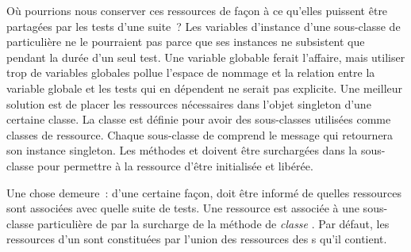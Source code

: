 \documentclass[a4paper,10pt,twoside]{book}
\begin{document}
Où pourrions nous conserver ces ressources de façon à ce qu'elles puissent être partagées par les tests d'une suite~?
Les variables d'instance d'une sous-classe de  particulière ne le pourraient pas parce que ses instances ne subsistent que pendant la durée d'un seul test.
Une variable globable ferait l'affaire, mais utiliser trop de variables globales pollue l'espace de nommage et la relation entre la variable globale et les tests qui en dépendent ne serait pas explicite.
Une meilleur solution est de placer les ressources nécessaires dans l'objet singleton d'une certaine classe. La classe  est définie pour avoir des sous-classes utilisées comme classes de ressource. Chaque sous-classe de  comprend le message  qui retournera son instance singleton.
Les méthodes   et  doivent être surchargées dans la sous-classe pour permettre à la ressource d'être initialisée et libérée.

Une chose demeure~: d'une certaine façon, \sunit doit être informé de quelles ressources sont associées avec quelle suite de tests. Une ressource est associée à une sous-classe particulière de  par la surcharge de la méthode de \emph{classe} .
Par défaut, les ressources d'un  sont constituées par l'union des ressources des s qu'il contient.

\end{document}
